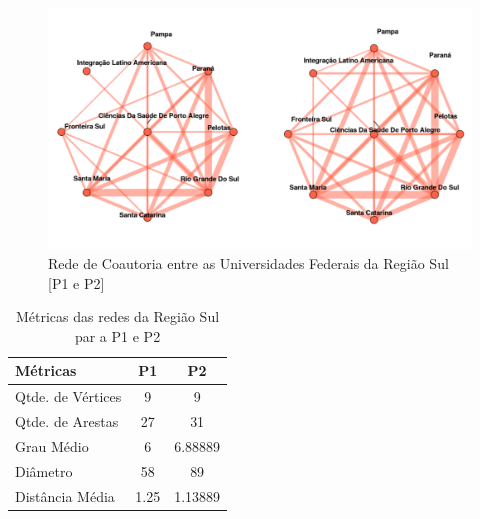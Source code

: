 \documentclass[12pt]{article}
\begin{document}
\begin{figure}[H]
\centering
\includegraphics[scale=0.6]{images/sul.pdf}
\caption{Rede de Coautoria entre as Universidades Federais da Região Sul [P1 e P2]}
\label{rede-sul}
\end{figure}


\begin{table}[H]
\centering
\begin{tabular}{lS[table-format=3.5]S[table-format=3.5]}
\hline
{} 
\textbf{Métricas} & \textbf{P1} & \textbf{P2} \\ \hline
Qtde. de Vértices & 9           & 9           \\ \hline
Qtde. de Arestas  & 27          & 31          \\ \hline
Grau Médio        & 6           & 6.88889     \\ \hline
Diâmetro          & 58          & 89           \\ \hline
Distância Média   & 1.25        & 1.13889     \\ \hline
\end{tabular}
\caption{Métricas das redes da Região Sul par a P1 e P2}
\end{table}



\nocite{*}

\end{document}

